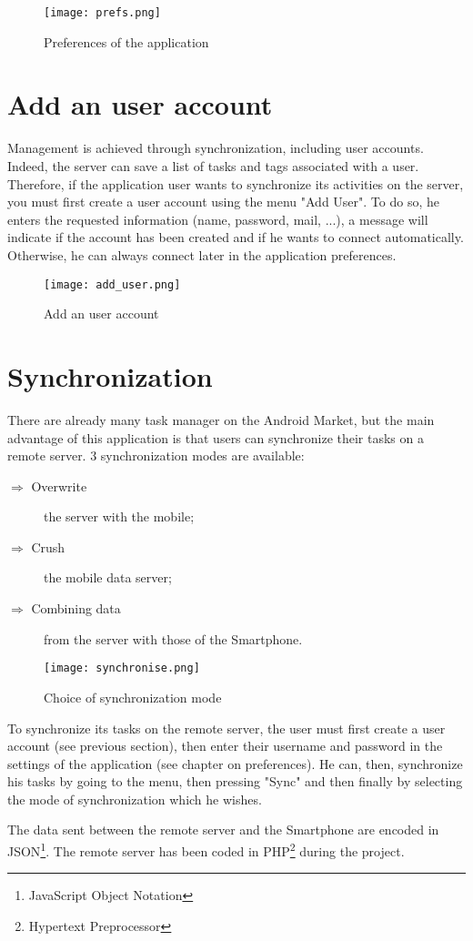 \begin{figure}[!ht]
    \centering
    \texttt{[image: prefs.png]}
    \caption{Preferences of the application}
\end{figure}

\section{Add an user account}

Management is achieved through synchronization, including user accounts. Indeed, the server can save a list of tasks and tags associated with a user. Therefore, if the application user wants to synchronize its activities on the server, you must first create a user account using the menu "Add User".
To do so, he enters the requested information (name, password, mail, ...), a message will indicate if the account has been created and if he wants to connect automatically. Otherwise, he can always connect later in the application preferences.

\begin{figure}[!ht]
    \centering
    \texttt{[image: add\_user.png]}
    \caption{Add an user account}
\end{figure}

\section{Synchronization}

There are already many task manager on the Android Market, but the main advantage of this application is that users can synchronize their tasks on a remote server.
3 synchronization modes are available:
\begin{description}
    \item[$\Rightarrow$ Overwrite] the server with the mobile;
    \item[$\Rightarrow$ Crush] the mobile data server;
    \item[$\Rightarrow$ Combining data] from the server with those of the Smartphone.
\end{description}

\begin{figure}[!ht]
    \centering
    \texttt{[image: synchronise.png]}
    \caption{Choice of synchronization mode}
\end{figure}

\noindent To synchronize its tasks on the remote server, the user must first create a user account (see previous section), then enter their username and password in the settings of the application (see chapter on preferences). He can, then, synchronize his tasks by going to the menu, then pressing "Sync" and then finally by selecting the mode of synchronization which he wishes.

\noindent The data sent between the remote server and the Smartphone are encoded in JSON\protect\footnote{JavaScript Object Notation}. The remote server has been coded in PHP\protect\footnote{Hypertext Preprocessor} during the project.

\clearpage
